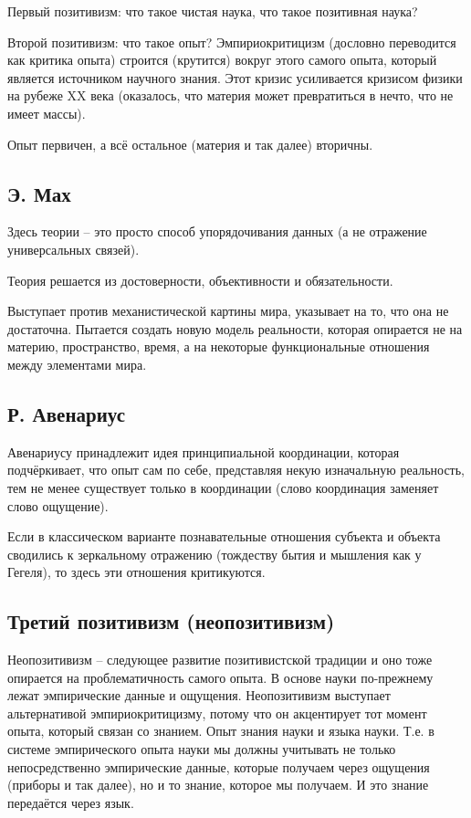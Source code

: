\documentclass[main.tex]{subfiles}
\begin{document}
Первый позитивизм: что такое чистая наука, что такое позитивная наука?

Второй позитивизм: что такое опыт?
Эмпириокритицизм (дословно переводится как критика опыта) строится (крутится) вокруг этого самого опыта, который является источником научного знания.
Этот кризис усиливается кризисом физики на рубеже XX века (оказалось, что материя может превратиться в нечто, что не имеет массы).

Опыт первичен, а всё остальное (материя и так далее) вторичны.

\subsection{Э. Мах}


Здесь теории -- это просто способ упорядочивания данных (а не отражение универсальных связей).

Теория решается из достоверности, объективности и обязательности.

Выступает против механистической картины мира, указывает на то, что она не достаточна.
Пытается создать новую модель реальности, которая опирается не на материю, пространство, время, а на некоторые функциональные отношения между элементами мира.

\subsection{Р. Авенариус}


Авенариусу принадлежит идея принципиальной координации, которая подчёркивает, что опыт сам по себе, представляя некую изначальную реальность, тем не менее существует только в координации (слово координация заменяет слово ощущение).

Если в классическом варианте познавательные отношения субъекта и объекта сводились к зеркальному отражению (тождеству бытия и мышления как у Гегеля), то здесь эти отношения критикуются. 

\subsection{Третий позитивизм (неопозитивизм)}


Неопозитивизм -- следующее развитие позитивистской традиции и оно тоже опирается на проблематичность самого опыта.
В основе науки по-прежнему лежат эмпирические данные и ощущения.
Неопозитивизм выступает альтернативой эмпириокритицизму, потому что он акцентирует тот момент опыта, который связан со знанием.
Опыт знания науки и языка науки.
Т.е. в системе эмпирического опыта науки мы должны учитывать не только непосредственно эмпирические данные, которые получаем через ощущения (приборы и так далее), но и то знание, которое мы получаем.
И это знание передаётся через язык.
\end{document}
